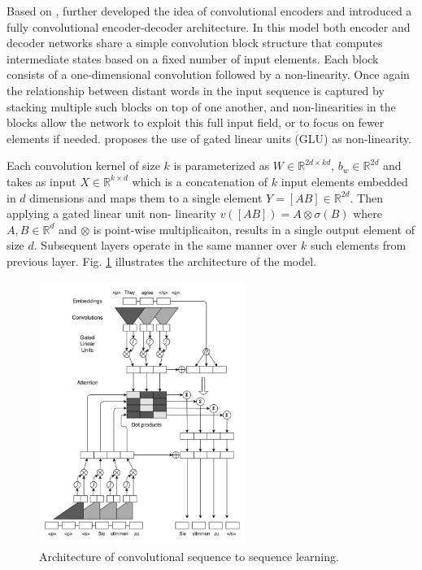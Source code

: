 \documentclass[a4paper]{article}
\newcommand{\R}{{\mathbb{R}}}
\begin{document}
Based                 on                 \cite{DBLP:journals/corr/GehringAGD16},
\citet{DBLP:journals/corr/GehringAGYD17}   further   developed   the   idea   of
convolutional  encoders and  introduced  a  fully convolutional  encoder-decoder
architecture. In this model  both  encoder  and decoder networks  share a simple
convolution block structure  that computes  intermediate states based on a fixed
number  of input elements.  Each block consists of a one-dimensional convolution
followed by  a non-linearity. Once  again the relationship between distant words
in the input sequence is captured by stacking multiple such blocks on top of one
another, and non-linearities in the  blocks  allow the  network to  exploit this
full   input   field,   or   to    focus   on   fewer   elements    if   needed.
\citet{DBLP:journals/corr/GehringAGYD17}  proposes the use of gated linear units
(GLU) as non-linearity.

Each  convolution kernel  of size $k$ is  parameterized as  $W \in \R^{2d \times
kd}$, $b_w \in \R^{2d}$  and takes as input $X \in  \R^{k \times d}$  which is a
concatenation of  $k$ input elements embedded in $d$ dimensions and maps them to
a single element $Y = [A B] \in \R^{2d}$. Then applying a gated linear unit non-
linearity $v([A B]) = A  \otimes \sigma(B)$ where $A, B \in  \R^d$ and $\otimes$
is point-wise  multiplicaiton, results in a single output element  of  size $d$.
Subsequent  layers  operate  in the  same manner  over  $k$ such  elements  from
previous layer. Fig.  \ref{fig:convseq2seq} illustrates the architecture  of the
model.


\begin{figure}
  \center
  \includegraphics[width=0.6\textwidth]{img/CS2S}
  \caption{Architecture of convolutional sequence to sequence learning.}
  \label{fig:convseq2seq}
\end{figure}
\end{document}
